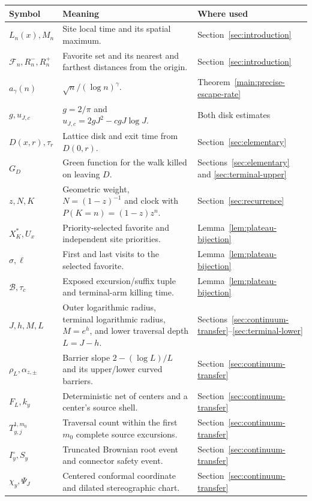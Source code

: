 \documentclass[12pt,reqno]{amsart}
\theoremstyle{plain}
\theoremstyle{definition}
\theoremstyle{remark}
\numberwithin{equation}{section}
\begin{document}
\small
\begin{longtable}{@{}p{}p{}p{}@{}}
\toprule
Symbol & Meaning & Where used \\
\midrule
\endhead
$L_n(x),M_n$ & Site local time and its spatial maximum. & Section~\ref{sec:introduction} \\
$\mathcal F_n,R_n^-,R_n^+$ & Favorite set and its nearest and farthest distances from the origin. & Section~\ref{sec:introduction} \\
$a_\gamma(n)$ & $\sqrt n/(\log n)^\gamma$. & Theorem~\ref{main:precise-escape-rate} \\
$g,u_{J,c}$ & $g=2/\pi$ and $u_{J,c}=2gJ^2-cgJ\log J$. & Both disk estimates \\
$D(x,r),\tau_r$ & Lattice disk and exit time from $D(0,r)$. & Section~\ref{sec:elementary} \\
$G_D$ & Green function for the walk killed on leaving $D$. & Sections~\ref{sec:elementary} and \ref{sec:terminal-upper} \\
$z,N,K$ & Geometric weight, $N=(1-z)^{-1}$ and clock with $P(K=n)=(1-z)z^n$. & Section~\ref{sec:recurrence} \\
$X_K^*,U_x$ & Priority-selected favorite and independent site priorities. & Lemma~\ref{lem:plateau-bijection} \\
$\sigma,\ell$ & First and last visits to the selected favorite. & Lemma~\ref{lem:plateau-bijection} \\
$\mathcal B,\tau_c$ & Exposed excursion/suffix tuple and terminal-arm killing time. & Lemma~\ref{lem:plateau-bijection} \\
$J,h,M,L$ & Outer logarithmic radius, terminal logarithmic radius, $M=e^h$, and lower traversal depth $L=J-h$. & Sections~\ref{sec:continuum-transfer}--\ref{sec:terminal-lower} \\
$\rho_L,\alpha_{z,\pm}$ & Barrier slope $2-(\log L)/L$ and its upper/lower curved barriers. & Section~\ref{sec:continuum-transfer} \\
$F_L,k_y$ & Deterministic net of centers and a center's source shell. & Section~\ref{sec:continuum-transfer} \\
$T_{y,j}^{1,m_0}$ & Traversal count within the first $m_0$ complete source excursions. & Section~\ref{sec:continuum-transfer} \\
$I_y^\circ,S_y$ & Truncated Brownian root event and connector safety event. & Section~\ref{sec:continuum-transfer} \\
$\chi_y,\Psi_J$ & Centered conformal coordinate and dilated stereographic chart. & Section~\ref{sec:continuum-transfer} \\

\end{longtable}
\end{document}
